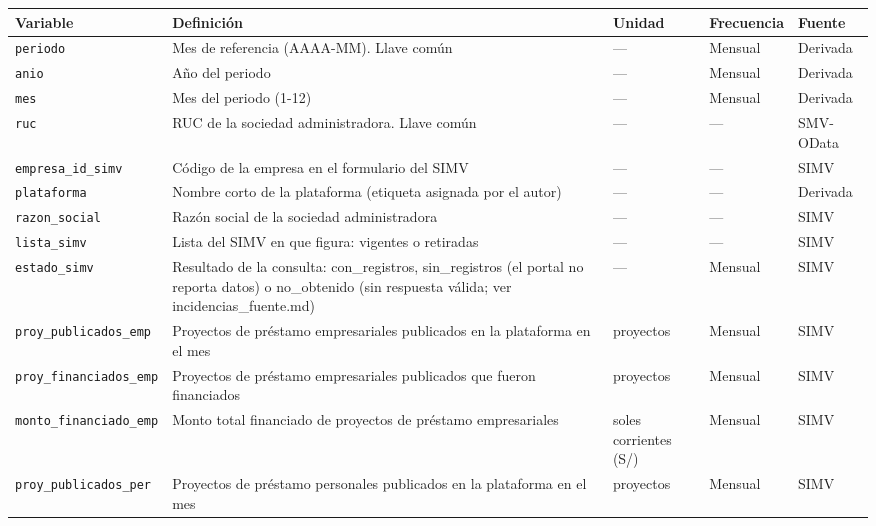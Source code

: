 {\footnotesize\setlength{\tabcolsep}{4pt}
\begin{longtable}{@{}>{\RaggedRight\arraybackslash}p{4.0cm}>{\RaggedRight\arraybackslash}p{6.0cm}>{\RaggedRight\arraybackslash}p{2.3cm}>{\RaggedRight\arraybackslash}p{1.7cm}>{\RaggedRight\arraybackslash}p{1.9cm}@{}}
\toprule
Variable & Definición & Unidad & Frecuencia & Fuente \\
\midrule
\endhead
\texttt{periodo} & Mes de referencia (AAAA-MM). Llave común & — & Mensual & Derivada \\
\texttt{anio} & Año del periodo & — & Mensual & Derivada \\
\texttt{mes} & Mes del periodo (1-12) & — & Mensual & Derivada \\
\texttt{ruc} & RUC de la sociedad administradora. Llave común & — & — & SMV-OData \\
\texttt{empresa\_\allowbreak{}id\_\allowbreak{}simv} & Código de la empresa en el formulario del SIMV & — & — & SIMV \\
\texttt{plataforma} & Nombre corto de la plataforma (etiqueta asignada por el autor) & — & — & Derivada \\
\texttt{razon\_\allowbreak{}social} & Razón social de la sociedad administradora & — & — & SIMV \\
\texttt{lista\_\allowbreak{}simv} & Lista del SIMV en que figura: vigentes o retiradas & — & — & SIMV \\
\texttt{estado\_\allowbreak{}simv} & Resultado de la consulta: con\_registros, sin\_registros (el portal no reporta datos) o no\_obtenido (sin respuesta válida; ver incidencias\_fuente.md) & — & Mensual & SIMV \\
\texttt{proy\_\allowbreak{}publicados\_\allowbreak{}emp} & Proyectos de préstamo empresariales publicados en la plataforma en el mes & proyectos & Mensual & SIMV \\
\texttt{proy\_\allowbreak{}financiados\_\allowbreak{}emp} & Proyectos de préstamo empresariales publicados que fueron financiados & proyectos & Mensual & SIMV \\
\texttt{monto\_\allowbreak{}financiado\_\allowbreak{}emp} & Monto total financiado de proyectos de préstamo empresariales & soles corrientes (S/) & Mensual & SIMV \\
\texttt{proy\_\allowbreak{}publicados\_\allowbreak{}per} & Proyectos de préstamo personales publicados en la plataforma en el mes & proyectos & Mensual & SIMV \\

\end{longtable}}
